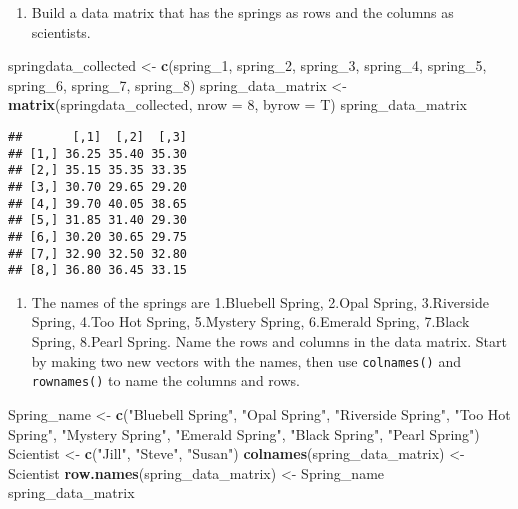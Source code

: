 \documentclass[
]{article}
\newenvironment{Shaded}{\begin{snugshade}}{\end{snugshade}}
\newcommand{\AttributeTok}[1]{\textcolor[rgb]{0.13,0.29,0.53}{#1}}
\newcommand{\DecValTok}[1]{\textcolor[rgb]{0.00,0.00,0.81}{#1}}
\newcommand{\FunctionTok}[1]{\textcolor[rgb]{0.13,0.29,0.53}{\textbf{#1}}}
\newcommand{\NormalTok}[1]{#1}
\newcommand{\OtherTok}[1]{\textcolor[rgb]{0.56,0.35,0.01}{#1}}
\newcommand{\StringTok}[1]{\textcolor[rgb]{0.31,0.60,0.02}{#1}}
\providecommand{\tightlist}{%
  \setlength{\itemsep}{0pt}\setlength{\parskip}{0pt}}
\begin{document}
\begin{enumerate}
\def\labelenumi{\arabic{enumi}.}
\setcounter{enumi}{3}
\tightlist
\item
  Build a data matrix that has the springs as rows and the columns as
  scientists.
\end{enumerate}

\begin{Shaded}
\begin{Highlighting}[]
\NormalTok{springdata\_collected }\OtherTok{\textless{}{-}} \FunctionTok{c}\NormalTok{(spring\_1, spring\_2, spring\_3, spring\_4, spring\_5, spring\_6, spring\_7, spring\_8)}
\NormalTok{spring\_data\_matrix }\OtherTok{\textless{}{-}} \FunctionTok{matrix}\NormalTok{(springdata\_collected, }\AttributeTok{nrow =} \DecValTok{8}\NormalTok{, }\AttributeTok{byrow =}\NormalTok{ T)}
\NormalTok{spring\_data\_matrix}
\end{Highlighting}
\end{Shaded}

\begin{verbatim}
##       [,1]  [,2]  [,3]
## [1,] 36.25 35.40 35.30
## [2,] 35.15 35.35 33.35
## [3,] 30.70 29.65 29.20
## [4,] 39.70 40.05 38.65
## [5,] 31.85 31.40 29.30
## [6,] 30.20 30.65 29.75
## [7,] 32.90 32.50 32.80
## [8,] 36.80 36.45 33.15
\end{verbatim}

\begin{enumerate}
\def\labelenumi{\arabic{enumi}.}
\setcounter{enumi}{4}
\tightlist
\item
  The names of the springs are 1.Bluebell Spring, 2.Opal Spring,
  3.Riverside Spring, 4.Too Hot Spring, 5.Mystery Spring, 6.Emerald
  Spring, 7.Black Spring, 8.Pearl Spring. Name the rows and columns in
  the data matrix. Start by making two new vectors with the names, then
  use \texttt{colnames()} and \texttt{rownames()} to name the columns
  and rows.
\end{enumerate}

\begin{Shaded}
\begin{Highlighting}[]
\NormalTok{Spring\_name }\OtherTok{\textless{}{-}} \FunctionTok{c}\NormalTok{(}\StringTok{"Bluebell Spring"}\NormalTok{, }\StringTok{"Opal Spring"}\NormalTok{, }\StringTok{"Riverside Spring"}\NormalTok{, }\StringTok{"Too Hot Spring"}\NormalTok{, }\StringTok{"Mystery Spring"}\NormalTok{, }\StringTok{"Emerald Spring"}\NormalTok{, }\StringTok{"Black Spring"}\NormalTok{, }\StringTok{"Pearl Spring"}\NormalTok{)}
\NormalTok{Scientist }\OtherTok{\textless{}{-}} \FunctionTok{c}\NormalTok{(}\StringTok{"Jill"}\NormalTok{, }\StringTok{"Steve"}\NormalTok{, }\StringTok{"Susan"}\NormalTok{)}
\FunctionTok{colnames}\NormalTok{(spring\_data\_matrix) }\OtherTok{\textless{}{-}}\NormalTok{ Scientist}
\FunctionTok{row.names}\NormalTok{(spring\_data\_matrix) }\OtherTok{\textless{}{-}}\NormalTok{ Spring\_name}
\NormalTok{spring\_data\_matrix}
\end{Highlighting}
\end{Shaded}
\end{document}
